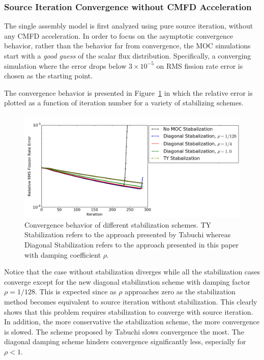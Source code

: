 \subsubsection{Source Iteration Convergence without CMFD Acceleration}

The single assembly model is first analyzed using pure source iteration, without any \ac{CMFD} acceleration. In order to focus on the asymptotic convergence behavior, rather than the behavior far from convergence, the \ac{MOC} simulations start with a \textit{good guess} of the scalar flux distribution. Specifically, a converging simulation where the error drops below $3\times 10^{-5}$ on RMS fission rate error is chosen as the starting point.

The convergence behavior is presented in Figure~\ref{fig:no-cmfd} in which the relative error is plotted as a function of iteration number for a variety of stabilizing schemes.
\begin{figure}[ht!]
	\centering
	\includegraphics[width=1.0\linewidth]{figures/convergence/no_cmfd.png}
	\caption{Convergence behavior of different stabilization schemes. TY Stabilization refers to the approach presented by Tabuchi whereas Diagonal Stabilization refers to the approach presented in this paper with damping coefficient $\rho$.}
	\label{fig:no-cmfd}
\end{figure}
Notice that the case without stabilization diverges while all the stabilization cases converge except for the new diagonal stabilization scheme with damping factor $\rho = 1/128$. This is expected since as $\rho$ approaches zero as the stabilization method becomes equivalent to source iteration without stabilization. This clearly shows that this problem requires stabilization to converge with source iteration. In addition, the more conservative the stabilization scheme, the more convergence is slowed. The scheme proposed by Tabuchi slows convergence the most. The diagonal damping scheme hinders convergence significantly less, especially for $\rho < 1$. 

